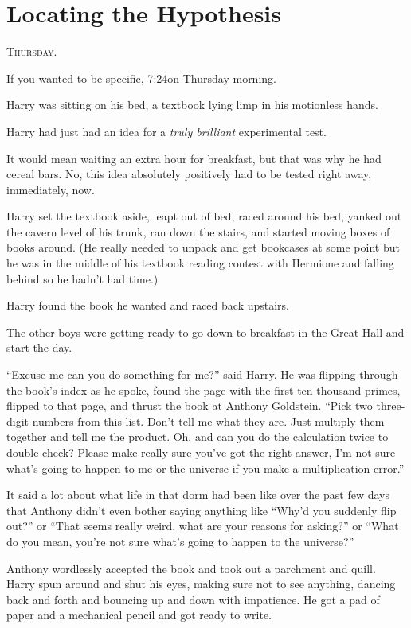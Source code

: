\chapter{Locating the Hypothesis}

\lettrine{T}{hursday}.

\hplettrineextrapara
If you wanted to be specific, 7:24\am on Thursday morning.

Harry was sitting on his bed, a textbook lying limp in his motionless hands.

Harry had just had an idea for a \emph{truly brilliant} experimental test.

It would mean waiting an extra hour for breakfast, but that was why he had cereal bars. No, this idea absolutely positively had to be tested right away, immediately, now.

Harry set the textbook aside, leapt out of bed, raced around his bed, yanked out the cavern level of his trunk, ran down the stairs, and started moving boxes of books around. (He really needed to unpack and get bookcases at some point but he was in the middle of his textbook reading contest with Hermione and falling behind so he hadn’t had time.)

Harry found the book he wanted and raced back upstairs.

The other boys were getting ready to go down to breakfast in the Great Hall and start the day.

“Excuse me can you do something for me?” said Harry. He was flipping through the book’s index as he spoke, found the page with the first ten thousand primes, flipped to that page, and thrust the book at Anthony Goldstein. “Pick two three-digit numbers from this list. Don’t tell me what they are. Just multiply them together and tell me the product. Oh, and can you do the calculation twice to double-check? Please make really sure you’ve got the right answer, I’m not sure what’s going to happen to me or the universe if you make a multiplication error.”

It said a lot about what life in that dorm had been like over the past few days that Anthony didn’t even bother saying anything like “Why’d you suddenly flip out?” or “That seems really weird, what are your reasons for asking?” or “What do you mean, you’re not sure what’s going to happen to the universe?”

Anthony wordlessly accepted the book and took out a parchment and quill. Harry spun around and shut his eyes, making sure not to see anything, dancing back and forth and bouncing up and down with impatience. He got a pad of paper and a mechanical pencil and got ready to write.

